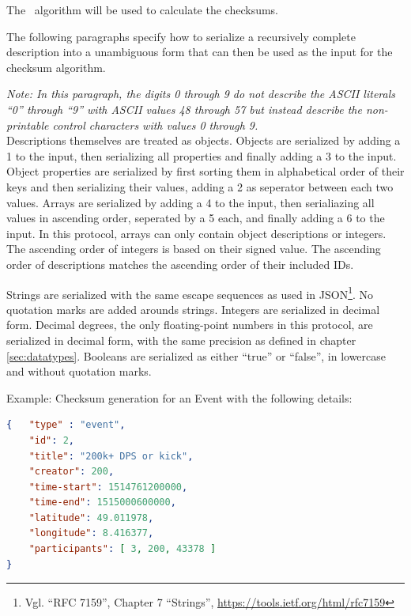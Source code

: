 \documentclass[parskip=full,11pt]{scrartcl}
\begin{document}
\par The \hashAlg~algorithm will be used to calculate the checksums.

\par The following paragraphs specify how to serialize a recursively complete
description into a unambiguous form that can then be used as the input for the
checksum algorithm.

\par \textit{Note: In this paragraph, the digits 0 through 9 do not describe
the ASCII literals \enquote{0} through \enquote{9} with ASCII values 48 through
57 but instead describe the non-printable control characters with values 0
through 9.}\\
Descriptions themselves are treated as objects.
Objects are serialized by adding a 1 to the input, then serializing all
properties and finally adding a 3 to the input.
Object properties are serialized by first sorting them in alphabetical order of
their keys and then serializing their values, adding a 2 as seperator between
each two values.
Arrays are serialized by adding a 4 to the input, then serialiazing all values
in ascending order, seperated by a 5 each, and finally adding a 6 to the input.
In this protocol, arrays can only contain object descriptions or integers.
The ascending order of integers is based on their signed value.
The ascending order of descriptions matches the ascending order of their
included IDs.

Strings are serialized with the same escape sequences as used in
JSON\footnote{Vgl. \enquote{RFC 7159}, Chapter 7 \enquote{Strings},
\url{https://tools.ietf.org/html/rfc7159}}.
No quotation marks are added arounds strings.
Integers are serialized in decimal form.
Decimal degrees, the only floating-point numbers in this protocol, are
serialized in decimal form, with the same precision as defined in chapter
\ref{sec:datatypes}.
Booleans are serialized as either \enquote{true} or \enquote{false}, in
lowercase and without quotation marks.

\par Example: Checksum generation for an Event with the following details:
\begin{lstlisting}[language=json,firstnumber=1]
{   "type" : "event",
    "id": 2,
    "title": "200k+ DPS or kick",
    "creator": 200,
    "time-start": 1514761200000,
    "time-end": 1515000600000,
    "latitude": 49.011978,
    "longitude": 8.416377,
    "participants": [ 3, 200, 43378 ]
}
\end{lstlisting}
\end{document}

